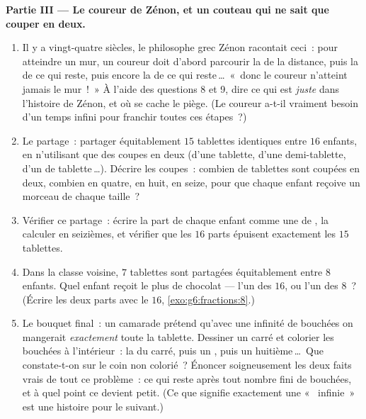 \begin{problem}
\medskip
\noindent\textbf{Partie III --- Le coureur de Zénon, et un couteau
qui ne sait que couper en deux.}
\begin{enumerate}[resume]
  \item Il y a vingt-quatre siècles, le philosophe grec Zénon
        racontait ceci~: pour atteindre un mur, un coureur doit
        d'abord parcourir la  de la distance, puis la 
        de ce qui reste, puis encore la  de ce qui
        reste\,\dots\ «~donc le coureur n'atteint jamais le
        mur~!~» À l'aide des questions 8 et 9, dire ce qui est
        \emph{juste} dans l'histoire de Zénon, et où se cache le
        piège. (Le coureur a-t-il vraiment besoin d'un temps infini
        pour franchir toutes ces étapes~?)
  \item Le partage~: partager équitablement $15$ tablettes
        identiques entre $16$ enfants, en n'utilisant que des coupes
        en deux (d'une tablette, d'une demi-tablette, d'un  de
        tablette\,\dots). Décrire les coupes~: combien de tablettes
        sont coupées en deux, combien en quatre, en huit, en seize,
        pour que chaque enfant reçoive un morceau de chaque taille~?
  \item Vérifier ce partage~: écrire la part de chaque enfant comme
        une  de , la calculer en seizièmes, et
        vérifier que les $16$ parts épuisent exactement les $15$
        tablettes.
  \item Dans la classe voisine, $7$ tablettes sont partagées
        équitablement entre $8$ enfants. Quel enfant reçoit le plus
        de chocolat --- l'un des $16$, ou l'un des $8$~? (Écrire les
        deux parts avec le  $16$,
        \cref{exo:g6:fractions:8}.)
  \item Le bouquet final~: un camarade prétend qu'avec une infinité
        de bouchées on mangerait \emph{exactement} toute la
        tablette. Dessiner un carré et colorier les bouchées à
        l'intérieur~: la  du carré, puis un , puis un
        huitième\,\dots\ Que constate-t-on sur le coin non colorié~?
        Énoncer soigneusement les deux faits vrais de tout ce
        problème~: ce qui reste après tout nombre fini de bouchées,
        et à quel point ce  devient petit. (Ce que signifie
        exactement une «~ infinie~» est une histoire pour le
         suivant.)
\end{enumerate}
\end{problem}
